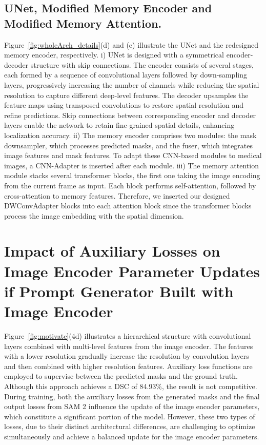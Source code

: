 \subsection{UNet, Modified Memory Encoder and Modified Memory Attention.}
Figure~\ref{fig:wholeArch_details}(d) and (e) illustrate the UNet and the redesigned memory encoder, respectively. 
i) UNet is designed with a symmetrical encoder-decoder structure with skip connections. The encoder consists of several stages, each formed by a sequence of convolutional layers followed by down-sampling layers, progressively increasing the number of channels while reducing the spatial resolution to capture different deep-level features. The decoder upsamples the feature maps using transposed convolutions to restore spatial resolution and refine predictions. Skip connections between corresponding encoder and decoder layers enable the network to retain fine-grained spatial details, enhancing localization accuracy.  
ii) The memory encoder comprises two modules: the mask downsampler, which processes predicted masks, and the fuser, which integrates image features and mask features. To adapt these CNN-based modules to medical images, a CNN-Adapter is inserted after each module.
iii) The memory attention module stacks several transformer blocks, the first one taking the image encoding from the current frame as input. Each block performs self-attention, followed by cross-attention to memory features. Therefore, we inserted our designed DWConvAdapter blocks into each attention block since the transformer blocks process the image embedding with the spatial dimension. 


\section{Impact of Auxiliary Losses on Image Encoder Parameter Updates if Prompt Generator Built with Image Encoder}
Figure~\ref{fig:motivate}(4d) illustrates a hierarchical structure with convolutional layers combined with multi-level features from the image encoder. The features with a lower resolution gradually increase the resolution by convolution layers and then combined with higher resolution features. Auxiliary loss functions are employed to supervise between the predicted masks and the ground truth. Although this approach achieves a DSC of 84.93\%, the result is not competitive. During training, both the auxiliary losses from the generated masks and the final output losses from SAM 2 influence the update of the image encoder parameters, which constitute a significant portion of the model. However, these two types of losses, due to their distinct architectural differences, are challenging to optimize simultaneously and achieve a balanced update for the image encoder parameters. 


